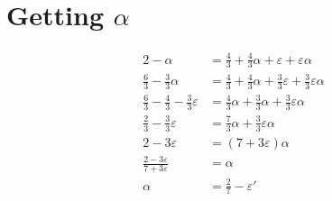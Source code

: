 \section{Getting $\alpha$}

\begin{align*}
2-\alpha &= \frac{4}{3} + \frac{4}{3} \alpha + \varepsilon + \varepsilon \alpha\\
\frac{6}{3} - \frac{3}{3}\alpha &= \frac{4}{3} + \frac{4}{3} \alpha +
\frac{3}{3}\varepsilon + \frac{3}{3}\varepsilon \alpha\\
\frac{6}{3} - \frac{4}{3} - \frac{3}{3}\varepsilon &= \frac{4}{3} \alpha +
\frac{3}{3}\alpha + \frac{3}{3}\varepsilon \alpha\\
\frac{2}{3} - \frac{3}{3}\varepsilon &= \frac{7}{3} \alpha + \frac{3}{3}\varepsilon \alpha\\
2 - 3 \varepsilon &= ( 7 + 3 \varepsilon) \alpha\\
\frac{2-3\varepsilon}{7+3\varepsilon} &= \alpha\\
\alpha &= \frac{2}{7} - \varepsilon'
\end{align*}

